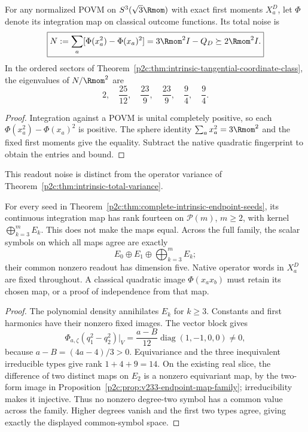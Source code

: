 \documentclass[11pt,a4paper]{article}
\begin{document}
\begin{corollary}
\label{p2c:cor:optimal-endpoint-total-noise}
For any normalized POVM on $S^3(\sqrt3\Rmom)$ with exact first moments
$X_a^D$, let $\Phi$ denote its integration map on classical outcome
functions.  Its total noise is
\[
 \boxed{N:=\sum_a[\Phi(x_a^2)-\Phi(x_a)^2]
        =3\Rmom^2I-Q_D\succeq2\Rmom^2I.}
\]
In the ordered sectors of
Theorem~\ref{p2c:thm:intrinsic-tangential-coordinate-class}, the eigenvalues
of $N/\Rmom^2$ are
\[
 2,\quad \frac{25}{12},\quad\frac{23}{9},\quad\frac{23}{9},
 \quad\frac94,\quad\frac94.
\]
\end{corollary}
\begin{proof}
Integration against a POVM is unital completely positive, so each
$\Phi(x_a^2)-\Phi(x_a)^2$ is positive.  The sphere identity
$\sum_a x_a^2=3\Rmom^2$ and the fixed first moments give the equality.
Subtract the native quadratic fingerprint to obtain the entries and bound.
\end{proof}
This readout noise is distinct from the operator variance of
Theorem~\ref{p2c:thm:intrinsic-total-variance}.

\begin{proposition}
\label{p2c:prop:endpoint-fixed-map-qualification}
For every seed in
Theorem~\ref{p2c:thm:complete-intrinsic-endpoint-seeds}, its continuous
integration map has rank fourteen on $\mathcal P(m)$, $m\ge2$, with kernel
$\bigoplus_{k=3}^mE_k$.  This does not make the maps equal.  Across the full
family, the scalar symbols on which all maps agree are exactly
\[
 E_0\oplus E_1\oplus\bigoplus_{k=3}^mE_k;
\]
their common nonzero readout has dimension five.
Native operator words in $X_a^D$ are fixed throughout.  A classical
quadratic image $\Phi(x_ax_b)$ must retain its chosen map, or a proof of
independence from that map.
\end{proposition}
\begin{proof}
The polynomial density annihilates $E_k$ for $k\ge3$.  Constants and first
harmonics have their nonzero fixed images.  The vector block gives
\[
 \Phi_{a,\zeta}(q_1^2-q_2^2)|_V
 =\frac{a-B}{12}\operatorname{diag}(1,-1,0,0)\ne0,
\]
because $a-B=(4a-4)/3>0$.  Equivariance and the three inequivalent
irreducible types give rank $1+4+9=14$.  On the existing real slice,
the difference of two distinct maps on $E_2$ is a nonzero equivariant
map, by the two-form image in
Proposition~\ref{p2c:prop:v233-endpoint-map-family}; irreducibility makes
it injective.  Thus no nonzero degree-two symbol has a common value
across the family.  Higher degrees vanish and the first two types agree,
giving exactly the displayed common-symbol space.
\end{proof}
\end{document}
